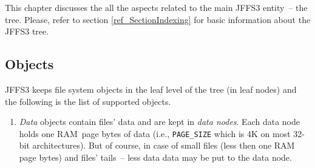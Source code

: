 This chapter discusses the all the aspects related to the main JFFS3 entity~--
the tree. Please, refer to section \ref{ref_SectionIndexing} for basic
information about the JFFS3 tree.

%
%
\subsection{Objects} \label{ref_SectionObjects}

JFFS3 keeps file system objects in the leaf level of the tree (in leaf nodes)
and the following is the list of supported objects.

\begin{enumerate}

\item \emph{Data} objects contain files' data and are kept in \emph{data
nodes}. Each data node holds one \mbox{RAM page} bytes of data (i.e.,
\texttt{PAGE\_SIZE} which is 4K on most \mbox{32-bit} architectures). But of
course, in case of small files (less then one RAM page bytes) and files'
tails~-- less data data may be put to the data node.


\end{enumerate}
